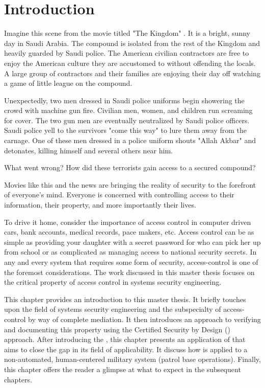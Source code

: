 \documentclass[../../main/main.tex]{subfiles}
\begin{document}
\glsresetall

\chapter{Introduction}
 Imagine this scene from the movie titled "The Kingdom" \cite{kingdom}.  It is a bright, sunny day in Saudi Arabia.  The compound is isolated from the rest of the Kingdom and heavily guarded by Saudi police.  The American civilian contractors are free to enjoy the American culture they are accustomed to without offending the locals.  A large group of contractors and their families are enjoying their day off watching a game of little league on the compound.  
 
 
Unexpectedly, two men dressed in Saudi police uniforms begin showering the crowd with machine gun fire.   Civilian men, women, and children run screaming for cover. The two gun men are eventually neutralized by Saudi police officers.  Saudi police yell to the survivors "come this way" to lure them away from the carnage. One of these men dressed in a police uniform shouts "Allah Akbar" and detonates, killing himself and several others near him. 

What went wrong?  How did these terrorists gain access to a secured compound?  

Movies like this and the news are bringing the reality of security to the forefront of everyone's mind.   Everyone is concerned with controlling access to their information, their property, and more importantly their lives.   

To drive it home, consider the importance of access control in computer driven cars, bank accounts, medical records, pace makers, etc.  Access control can be as simple as providing your daughter with a secret password for who can pick her up from school or as complicated as managing access to national security secrets.  In any and every system that requires some form of security, access-control is one of the foremost considerations. The work discussed in this master thesis focuses on the critical property of access control in systems security engineering.

This chapter provides an introduction to this master thesis.  It briefly touches upon the field of systems security engineering and the subspecialty of access-control by way of complete mediation.  It then introduces an approach to verifying and documenting this property using the Certified Security by Design () approach.  After introducing the , this chapter presents an application of  that aims to close the gap in its field of applicability.  It discuss how  is applied to a non-automated, human-centered military system (patrol base operations).  Finally, this chapter offers the reader a glimpse at what to expect in the subsequent chapters.
\end{document}
